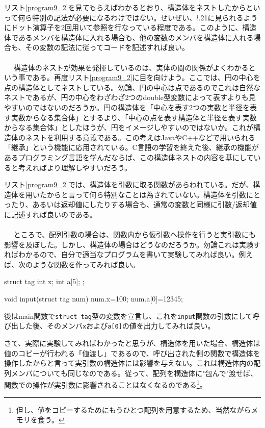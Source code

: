 リスト\ref{program9_2}を見てもらえばわかるとおり、構造体をネストしたからといって何ら特別の記法が必要になるわけではない。せいぜい、$l$.21に見られるようにドット演算子を2回用いて参照を行なっている程度である。このように、構造体であるメンバを構造体に入れる場合も、他の変数のメンバを構造体に入れる場合も、その変数の記法に従ってコードを記述すれば良い。
\\ \\　
構造体のネストが効果を発揮しているのは、実体の間の関係がよくわかるという事である。再度リスト\ref{program9_2}に目を向けよう。ここでは、円の中心を点の構造体としてネストしている。勿論、円の中心は点であるのでこれは自然なネストであるが、円の中心をわざわざ2つのdouble型変数によって表すよりも見やすいのではないのだろうか。円の構造体を「中心を表す2つの実数と半径を表す実数からなる集合体」とするより、「中心の点を表す構造体と半径を表す実数からなる集合体」としたほうが、円をイメージしやすいのではないか。これが構造体のネストを利用する意義である。この考えはJavaやC++などで用いられる「継承」という機能に応用されている。C言語の学習を終えた後、継承の機能があるプログラミング言語を学んだならば、この構造体ネストの内容を基にしていると考えればより理解しやすいだろう。

リスト\ref{program9_2}では、構造体を引数に取る関数があらわれている。だが、構造体を用いたからと言って何ら特別なことは為されていない。構造体を引数にとったり、あるいは返却値にしたりする場合も、通常の変数と同様に引数/返却値に記述すれば良いのである。
\\ \\　
ところで、配列引数の場合は、関数内から仮引数へ操作を行うと実引数にも影響を及ぼした。しかし、構造体の場合はどうなのだろうか。勿論これは実験すればわかるので、自分で適当なプログラムを書いて実験してみれば良い。例えば、次のような関数を作ってみれば良い。
\begin{code}
struct tag{
  int x;
  int a[5];
};

void input(struct tag num){
  num.x=100;
  num.a[0]=12345;
}
\end{code}
後はmain関数で\verb|struct tag|型の変数を宣言し、これを\verb|input|関数の引数にして呼び出した後、そのメンバ\verb|x|および\verb|a[0]|の値を出力してみれば良い。

さて、実際に実験してみればわかったと思うが、構造体を用いた場合、構造体は値のコピーが行われる「値渡し」であるので、呼び出された側の関数で構造体を操作したからと言って実引数の構造体には影響を与えない。これは構造体内の配列メンバについても同じなのである。従って、配列を構造体に"包んで"渡せば、関数での操作が実引数に影響されることはなくなるのである\footnote{但し、値をコピーするためにもうひとつ配列を用意するため、当然ながらメモリを食う。}。

